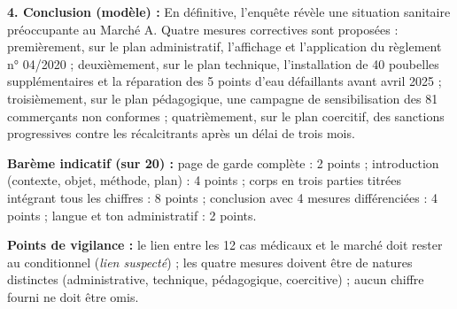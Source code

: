\documentclass[11pt]{article}
\begin{document}
\begin{corrige}
\textbf{4. Conclusion (modèle) :} En définitive, l'enquête révèle une situation sanitaire préoccupante au Marché A. Quatre mesures correctives sont proposées : premièrement, sur le plan administratif, l'affichage et l'application du règlement n° 04/2020 ; deuxièmement, sur le plan technique, l'installation de 40 poubelles supplémentaires et la réparation des 5 points d'eau défaillants avant avril 2025 ; troisièmement, sur le plan pédagogique, une campagne de sensibilisation des 81 commerçants non conformes ; quatrièmement, sur le plan coercitif, des sanctions progressives contre les récalcitrants après un délai de trois mois.

\textbf{Barème indicatif (sur 20) :} page de garde complète : 2 points ; introduction (contexte, objet, méthode, plan) : 4 points ; corps en trois parties titrées intégrant tous les chiffres : 8 points ; conclusion avec 4 mesures différenciées : 4 points ; langue et ton administratif : 2 points.

\textbf{Points de vigilance :} le lien entre les 12 cas médicaux et le marché doit rester au conditionnel (\emph{lien suspecté}) ; les quatre mesures doivent être de natures distinctes (administrative, technique, pédagogique, coercitive) ; aucun chiffre fourni ne doit être omis.
\end{corrige}
\end{document}

